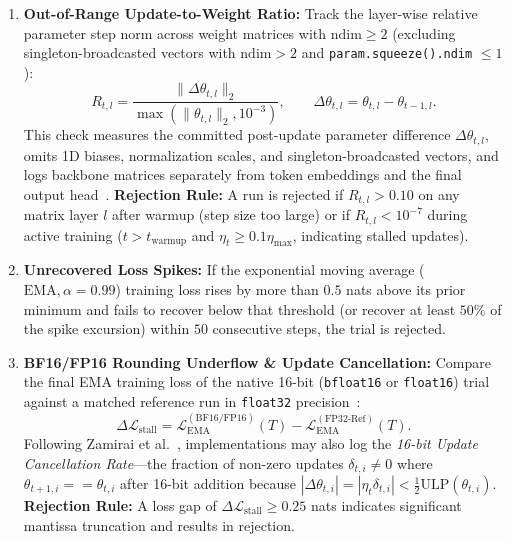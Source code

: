 \documentclass[11pt,a4paper]{article}
\renewcommand{\_}{\origunderscore\allowbreak}
\begin{document}
\begin{enumerate}[label=\textbf{F\arabic*.}, leftmargin=2.4em, itemsep=0.45em]
    \item \textbf{Out-of-Range Update-to-Weight Ratio:} Track the layer-wise relative parameter step norm across weight matrices with $\text{ndim} \ge 2$ (excluding singleton-broadcasted vectors with $\text{ndim} > 2$ and \texttt{param.squeeze().ndim} $\le 1$):
    \begin{equation}
        R_{t,l} = \frac{\|\Delta\theta_{t,l}\|_2}{\max(\|\theta_{t,l}\|_2, 10^{-3})}, \qquad \Delta\theta_{t,l} = \theta_{t,l} - \theta_{t-1,l}.
    \end{equation}
    This check measures the committed post-update parameter difference $\Delta\theta_{t,l}$, omits 1D biases, normalization scales, and singleton-broadcasted vectors, and logs backbone matrices separately from token embeddings and the final output head~\cite{brock2021nfnet}. \textbf{Rejection Rule:} A run is rejected if $R_{t,l} > 0.10$ on any matrix layer $l$ after warmup (step size too large) or if $R_{t,l} < 10^{-7}$ during active training ($t > t_{\text{warmup}}$ and $\eta_t \ge 0.1\eta_{\max}$, indicating stalled updates).

    \item \textbf{Unrecovered Loss Spikes:} If the exponential moving average ($\text{EMA}, \alpha = 0.99$) training loss rises by more than $0.5$ nats above its prior minimum and fails to recover below that threshold (or recover at least $50\%$ of the spike excursion) within $50$ consecutive steps, the trial is rejected.

    \item \textbf{BF16/FP16 Rounding Underflow \& Update Cancellation:} Compare the final EMA training loss of the native 16-bit (\texttt{bfloat16} or \texttt{float16}) trial against a matched reference run in \texttt{float32} precision~\cite{gupta2015limited,zamirai2021revisiting}:
    \begin{equation}
        \Delta\mathcal{L}_{\text{stall}} = \mathcal{L}_{\text{EMA}}^{(\text{BF16/FP16})}(T) - \mathcal{L}_{\text{EMA}}^{(\text{FP32-Ref})}(T).
    \end{equation}
    Following Zamirai et al.~\cite{zamirai2021revisiting}, implementations may also log the \textit{16-bit Update Cancellation Rate}---the fraction of non-zero updates $\delta_{t,i} \neq 0$ where $\theta_{t+1,i} == \theta_{t,i}$ after 16-bit addition because $|\Delta\theta_{t,i}| = |\eta_t\delta_{t,i}| < \frac{1}{2}\text{ULP}(\theta_{t,i})$. \textbf{Rejection Rule:} A loss gap of $\Delta\mathcal{L}_{\text{stall}} \ge 0.25$ nats indicates significant mantissa truncation and results in rejection.
\end{enumerate}
\end{document}
